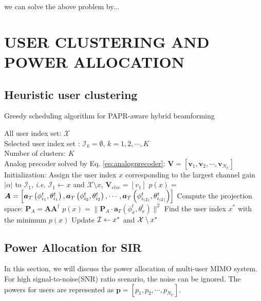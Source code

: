 \documentclass[conference]{IEEEtran}
\begin{document}
we can solve the above problem by...


\section{USER CLUSTERING AND POWER ALLOCATION}
\subsection{Heuristic user clustering}

\begin{algorithm}[h] 		
	\caption{Greedy scheduling algorithm for PAPR-aware hybrid beamforming}
	\label{selection}
	\begin{algorithmic}
		\REQUIRE  \quad
		\STATE	All user index set: $\mathcal{X}$\\
		\STATE  Selected user index set : $\mathcal{I}_k=\emptyset$, $k=1,2,\cdots, K$\\
		\STATE  Number of clusters: $K$\\
		\STATE  Analog precoder solved by Eq. \eqref{eq:analogprecoder}: $\bm{V}=[\bm{v}_1,\bm{v}_2,\cdots,\bm{v}_{N_U}]$
		\ENSURE   	
		\STATE Initialization: Assign the user index $x$ corresponding to the largest channel gain $|\alpha|$ to ${\mathcal I}_1$, {\em i.e.} $\mathcal{I}_1 \leftarrow  x$ and ${\mathcal X}\setminus x$, 
		\STATE $\bm{V}_{else} = [v_1]$
		\STATE $p(x) = $
		\ENDFOR
		\STATE ${\bm A}=\left[\bm{a}_{T}\left(\phi^t_{i_1},\theta^t_{i_1}\right),\bm{a}_{T}\left(\phi^t_{i_2},\theta^t_{i_2}\right),\cdots,\bm{a}_{T}\left(\phi^t_{i_{|{\cal I}|}},\theta^t_{i_{|{\cal I}|}}\right)\right]$
		\STATE Compute the projection space: ${\bm P}_A = {\bm A}{\bm A}^{\dagger}$ 		 				
		\STATE $p(x) = \|{\bm P}_A\cdot {\bm a}_T\left(\phi^t_{x},\theta^t_{x}\right)\|^2$ 				 								
		\ENDFOR
		\STATE  Find the user index $x^*$ with the minimum $p(x)$ 									
		\STATE	Update ${\cal I} \leftarrow  x^*$ and ${\cal X}\setminus x^*$	
		\ENDWHILE	
	\end{algorithmic}
\end{algorithm}

\subsection{Power Allocation for SIR}

In this section, we will discuss the power allocation of multi-user MIMO system. For high signal-to-noise(SNR) ratio scenario, the noise can be ignored. The powers for users are represented as $\bm{p}=[p_1, p_2, \cdots, p_{N_U}]$. 
\end{document}
